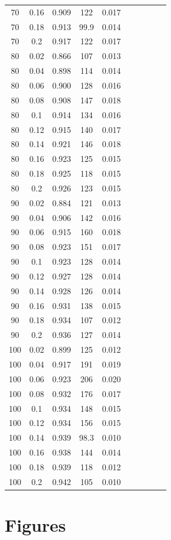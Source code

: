 \documentclass[12pt]{article}
\begin{document}
\begin{table}[h!]
\begin{tabular}{c c | c | c c ||c c | c | c c |}
			70&0.16&0.909&122&0.017\\ 
			70&0.18&0.913&99.9&0.014\\ 
			70&0.2&0.917&122&0.017\\ 
			80&0.02&0.866&107&0.013\\ 
			80&0.04&0.898&114&0.014\\ 
			80&0.06&0.900&128&0.016\\ 
			80&0.08&0.908&147&0.018\\ 
			80&0.1&0.914&134&0.016\\ 
			80&0.12&0.915&140&0.017\\ 
			80&0.14&0.921&146&0.018\\ 
			80&0.16&0.923&125&0.015\\ 
			80&0.18&0.925&118&0.015\\ 
			80&0.2&0.926&123&0.015\\ 
			90&0.02&0.884&121&0.013\\ 
			90&0.04&0.906&142&0.016\\ 
			90&0.06&0.915&160&0.018\\ 
			90&0.08&0.923&151&0.017\\ 
			90&0.1&0.923&128&0.014\\ 
			90&0.12&0.927&128&0.014\\ 
			90&0.14&0.928&126&0.014\\ 
			90&0.16&0.931&138&0.015\\ 
			90&0.18&0.934&107&0.012\\ 
			90&0.2&0.936&127&0.014\\ 
			100&0.02&0.899&125&0.012\\ 
			100&0.04&0.917&191&0.019\\ 
			100&0.06&0.923&206&0.020\\ 
			100&0.08&0.932&176&0.017\\ 
			100&0.1&0.934&148&0.015\\ 
			100&0.12&0.934&156&0.015\\ 
			100&0.14&0.939&98.3&0.010\\ 
			100&0.16&0.938&144&0.014\\ 
			100&0.18&0.939&118&0.012\\ 
			100&0.2&0.942&105&0.010\\ 
			\hline
		\end{tabular}
		\end{table}


\section{Figures}
\end{document}
